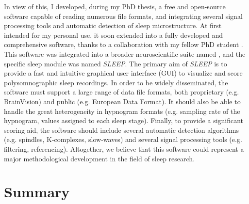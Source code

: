 In view of this, I developed, during my PhD thesis, a free and open-source software capable of reading numerous file formats, and integrating several signal processing tools and automatic detection of sleep microstructure. At first intended for my personal use, it soon extended into a fully developed and comprehensive software, thanks to a collaboration with my fellow PhD student . This software was integrated into a broader neuroscientific suite named , and the specific sleep module was named \textit{SLEEP}. The primary aim of \textit{SLEEP} is to provide a fast and intuitive graphical user interface (GUI) to visualize and score polysomnographic sleep recordings. In order to be widely disseminated, the software must support a large range of data file formats, both proprietary (e.g. BrainVision) and public (e.g. European Data Format). It should also be able to handle the great heterogeneity in hypnogram formats (e.g. sampling rate of the hypnogram, values assigned to each sleep stage). Finally, to provide a significant scoring aid, the software should include several automatic detection algorithms (e.g. spindles, K-complexes, slow-waves) and several signal processing tools (e.g. filtering, referencing). Altogether, we believe that this software could represent a major methodological development in the field of sleep research.

\section{Summary}
\label{sec:problematic:summary}

